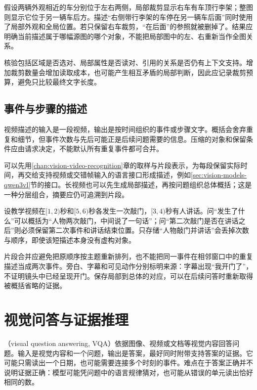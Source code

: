 假设两辆外观相近的车分别位于左右两侧，局部裁剪显示右车有车顶行李架；整图则显示它位于另一辆车后方。描述“右侧带行李架的车停在另一辆车后面”同时使用了局部外观和全局位置。若只保留右车裁剪，“在后面”的参照就被删掉了。结果应明确当前描述属于哪幅源图的哪个对象，不能把局部图中的左、右重新当作全图关系。

核验包括区域是否选对、局部属性是否读对、引用的关系是否仍有上下文支持。增加裁剪数量会增加读取成本，也可能产生相互矛盾的局部判断，因此应记录裁剪预算，避免只比较最终文字长度。

\subsection{事件与步骤的描述}
\label{sec:vision-understanding-event-caption}
\label{sec:vision-understanding-hierarchical-caption}

视频描述的输入是一段视频，输出是按时间组织的事件或步骤文字。概括会舍弃重复和细节，但事件次数与先后可能正是后续问题需要的信息。压缩的对象和保留条件应由请求决定，不能默认所有重复事件都可合并。

可以先用\ref{chap:vision-video-recognition}章的取样与片段表示，为每段保留实际时间，再交给支持视频或交错帧输入的语言接口形成描述，例如\ref{sec:vision-models-qwen3vl}节的接口。长视频也可以先生成局部描述，再按问题组织总体概括；这是一种分层组合，摘要应仍可追溯到片段。

设教学视频在$[1,2)$秒和$[5,6)$秒各发生一次敲门，$[3,4)$秒有人讲话。问“发生了什么”可以概括为“人物两次敲门，中间说了一句话”；问“第二次敲门是否在讲话之后”则必须保留第二次事件和讲话结束位置。只存储“人物敲门并讲话”会丢掉次数与顺序，即使该短描述本身没有虚构对象。

片段合并应避免把原顺序按主题重新排列，也不能把同一事件在相邻窗口中的重复描述当成两次事件。旁白、字幕和可见动作分别标明来源：字幕出现“我开门了”，不证明镜头中已经呈现开门。保存局部到总体的对应，可以在后续问答时重新取得被概括省略的证据。

\section{视觉问答与证据推理}
\label{sec:vision-understanding-qa}

（visual question answering, VQA）依据图像、视频或文档等视觉内容回答问题。输入是视觉内容和一个问题，输出是答案，最好同时附带支持答案的证据。它可能只需读出一个日期，也可能需要连接多个时刻的事件。难点在于答案正确并不说明证据正确：模型可能凭问题中的语言规律猜对，也可能从错误的单元读出恰好相同的数。

